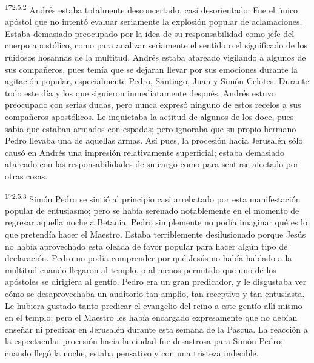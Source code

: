 \par 
\textsuperscript{172:5.2} Andrés estaba totalmente desconcertado, casi desorientado. Fue el único apóstol que no intentó evaluar seriamente la explosión popular de aclamaciones. Estaba demasiado preocupado por la idea de su responsabilidad como jefe del cuerpo apostólico, como para analizar seriamente el sentido o el significado de los ruidosos hosannas de la multitud. Andrés estaba atareado vigilando a algunos de sus compañeros, pues temía que se dejaran llevar por sus emociones durante la agitación popular, especialmente Pedro, Santiago, Juan y Simón Celotes. Durante todo este día y los que siguieron inmediatamente después, Andrés estuvo preocupado con serias dudas, pero nunca expresó ninguno de estos recelos a sus compañeros apostólicos. Le inquietaba la actitud de algunos de los doce, pues sabía que estaban armados con espadas; pero ignoraba que su propio hermano Pedro llevaba una de aquellas armas. Así pues, la procesión hacia Jerusalén sólo causó en Andrés una impresión relativamente superficial; estaba demasiado atareado con las responsabilidades de su cargo como para sentirse afectado por otras cosas.

\par 
\textsuperscript{172:5.3} Simón Pedro se sintió al principio casi arrebatado por esta manifestación popular de entusiasmo; pero se había serenado notablemente en el momento de regresar aquella noche a Betania. Pedro simplemente no podía imaginar qué es lo que pretendía hacer el Maestro. Estaba terriblemente desilusionado porque Jesús no había aprovechado esta oleada de favor popular para hacer algún tipo de declaración. Pedro no podía comprender por qué Jesús no había hablado a la multitud cuando llegaron al templo, o al menos permitido que uno de los apóstoles se dirigiera al gentío. Pedro era un gran predicador, y le disgustaba ver cómo se desaprovechaba un auditorio tan amplio, tan receptivo y tan entusiasta. Le hubiera gustado tanto predicar el evangelio del reino a este gentío allí mismo en el templo; pero el Maestro les había encargado expresamente que no debían enseñar ni predicar en Jerusalén durante esta semana de la Pascua. La reacción a la espectacular procesión hacia la ciudad fue desastrosa para Simón Pedro; cuando llegó la noche, estaba pensativo y con una tristeza indecible.

